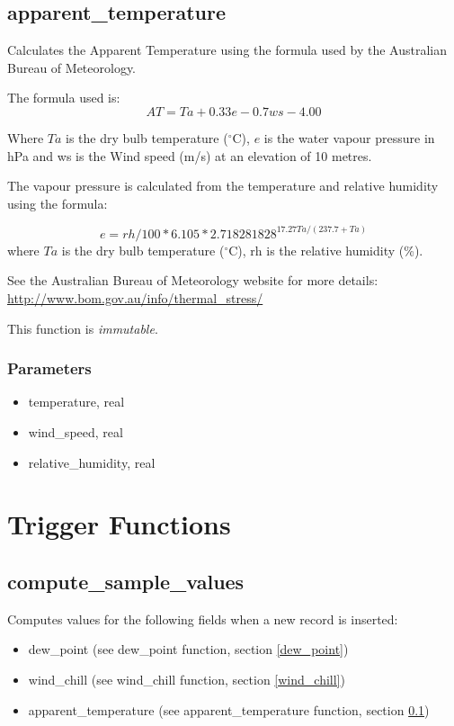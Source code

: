 \documentclass[a4paper,10pt]{book}
\begin{document}
\subsection{apparent\_temperature}
\label{apparent_temperature}
Calculates the Apparent Temperature using the formula used by the Australian Bureau of Meteorology.

The formula used is:
$$AT = Ta + 0.33e - 0.7ws - 4.00$$

Where $Ta$ is the dry bulb temperature ($^{\circ}$C), $e$ is the water vapour pressure in hPa and ws is the Wind speed (m/s) at an elevation of 10 metres.

The vapour pressure is calculated from the temperature and relative humidity using the formula:

$$  e = rh / 100 * 6.105 * 2.718281828 ^ { 17.27Ta / (237.7 + Ta ) }$$
where $Ta$ is the dry bulb temperature ($^{\circ}$C), rh is the relative humidity (\%).

See the Australian Bureau of Meteorology website for more details: \\ \url{http://www.bom.gov.au/info/thermal_stress/}

This function is \emph{immutable}.

\subsubsection{Parameters}
\begin{itemize}
\item temperature, real
\item wind\_speed, real
\item relative\_humidity, real
\end{itemize}

\section{Trigger Functions}
\label{trig_funcs}
\subsection{compute\_sample\_values}
\label{compute_sample_values}
Computes values for the following fields when a new record is inserted:
\begin{itemize}
\item dew\_point (see dew\_point function, section \ref{dew_point})
\item wind\_chill (see wind\_chill function, section \ref{wind_chill})
\item apparent\_temperature (see apparent\_temperature function, section \ref{apparent_temperature})
\end{itemize}
\end{document}
